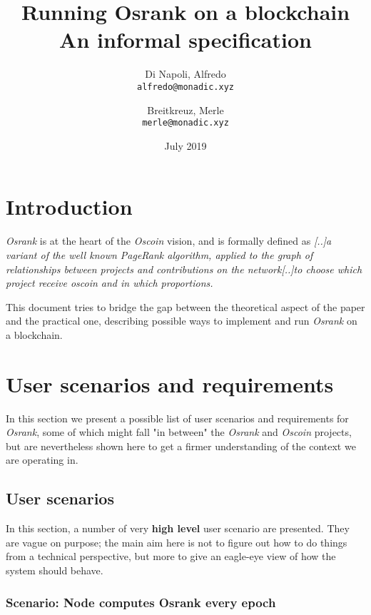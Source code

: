 \documentclass{article}
\title{%
Running Osrank on a blockchain \\
\large An informal specification \\
}
\author{
  Di Napoli, Alfredo\\
  \texttt{alfredo@monadic.xyz}
  \and
  Breitkreuz, Merle\\
  \texttt{merle@monadic.xyz}
}
\date{July 2019}
\begin{document}
\maketitle

\tableofcontents

\section{Introduction}
\textit{Osrank} is at the heart of the \textit{Oscoin} vision, and is formally defined as \textit{[..]a variant of the well known PageRank algorithm, applied to the graph of relationships between projects and contributions on the network[..]to choose which project receive oscoin and in which proportions.}\citep{opensourcecoin2019}

This document tries to bridge the gap between the theoretical aspect of the paper and the practical one, describing possible ways to implement and run \textit{Osrank} on a blockchain.

\section{User scenarios and requirements}

In this section we present a possible list of user scenarios and requirements for \textit{Osrank}, some of which might fall "in between" the \textit{Osrank} and \textit{Oscoin} projects, but are nevertheless shown here to get a firmer
understanding of the context we are operating in.

\subsection{User scenarios}

In this section, a number of very \textbf{high level} user scenario are
presented. They are vague on purpose; the main aim here is not to figure out
how to do things from a technical perspective, but more to give an eagle-eye
view of how the system should behave.

\subsubsection{Scenario: Node computes Osrank every epoch}
\end{document}
